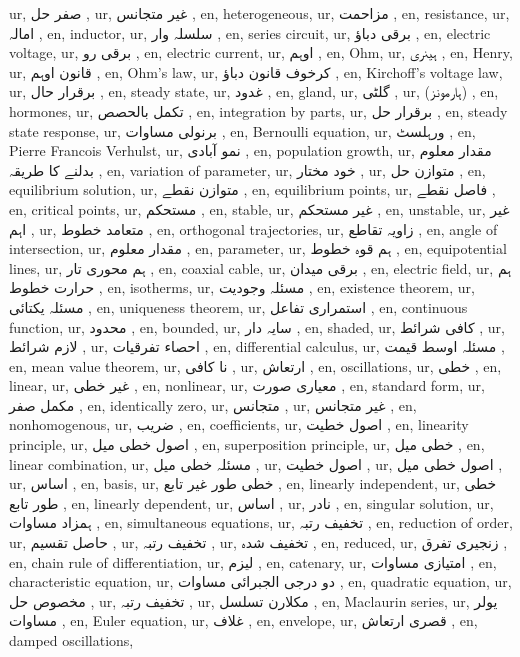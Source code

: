 ur, صفر حل ,
ur, غیر متجانس ,
en, heterogeneous,
ur, مزاحمت ,
en, resistance,
ur, امالہ ,
en, inductor,
ur, سلسلہ وار ,
en, series circuit,
ur, برقی دباؤ ,
en, electric voltage,
ur, برقی رو ,
en, electric current,
ur, اوہم ,
en, Ohm,
ur, ہینری ,
en, Henry,
ur, قانون اوہم ,
en, Ohm's law,
ur, کرخوف قانون دباؤ ,
en, Kirchoff's voltage law,
ur, برقرار حال ,
en, steady state,
ur, غدود ,
en, gland,
ur, گلٹی ,
ur, (ہارمونز) ,
en, hormones,
ur, تکمل بالحصص ,
en, integration by parts,
ur, برقرار حل ,
en, steady state response,
ur, برنولی مساوات ,
en, Bernoulli equation,
ur, ورہلسٹ ,
en, Pierre Francois Verhulst,
ur, نمو آبادی ,
en, population growth,
ur, مقدار معلوم بدلنے کا طریقہ ,
en, variation of parameter,
ur, خود مختار ,
ur, متوازن حل ,
en, equilibrium solution,
ur, متوازن نقطے ,
en, equilibrium points,
ur, فاصل نقطے ,
en, critical points,
ur, مستحکم ,
en, stable,
ur, غیر مستحکم ,
en, unstable,
ur, غیر اہم ,
ur, متعامد خطوط ,
en, orthogonal trajectories,
ur, زاویہ تقاطع ,
en, angle of intersection,
ur, مقدار معلوم ,
en, parameter,
ur, ہم قوہ خطوط ,
en, equipotential lines,
ur, ہم محوری تار ,
en, coaxial cable,
ur, برقی میدان ,
en, electric field,
ur, ہم حرارت خطوط ,
en, isotherms,
ur, مسئلہ وجودیت ,
en, existence theorem,
ur, مسئلہ یکتائی ,
en, uniqueness theorem,
ur, استمراری تفاعل ,
en, continuous function,
ur, محدود ,
en, bounded,
ur, سایہ دار ,
en, shaded,
ur, کافی شرائط ,
ur, لازم شرائط ,
ur, احصاء تفرقیات ,
en, differential calculus,
ur, مسئلہ اوسط قیمت ,
en, mean value theorem,
ur, نا کافی ,
ur, ارتعاش ,
en, oscillations,
ur, خطی ,
en, linear,
ur, غیر خطی ,
en, nonlinear,
ur, معیاری صورت ,
en, standard form,
ur, مکمل صفر ,
en, identically zero,
ur, متجانس ,
ur, غیر متجانس ,
en, nonhomogenous,
ur,  ضریب  ,
en, coefficients,
ur, اصول خطیت ,
en, linearity principle,
ur, اصول خطی میل ,
en, superposition principle,
ur, خطی میل ,
en, linear combination,
ur, مسئلہ خطی میل ,
ur, اصول خطیت ,
ur, اصول خطی میل ,
ur, اساس ,
en, basis,
ur, خطی طور غیر تابع ,
en, linearly independent,
ur, خطی طور تابع ,
en, linearly dependent,
ur, اساس ,
ur, نادر ,
en, singular solution,
ur, ہمزاد مساوات ,
en, simultaneous equations,
ur, تخفیف رتبہ ,
en, reduction of order,
ur, حاصل تقسیم ,
ur, تخفیف رتبہ ,
ur, تخفیف شدہ ,
en, reduced,
ur, زنجیری تفرق ,
en, chain rule of differentiation,
ur, لیزم ,
en, catenary,
ur, امتیازی مساوات ,
en, characteristic equation,
ur, دو درجی الجبرائی مساوات ,
en, quadratic equation,
ur, مخصوص حل ,
ur, تخفیف رتبہ ,
ur, مکلارن تسلسل ,
en, Maclaurin series,
ur, یولر مساوات ,
en, Euler equation,
ur, غلاف ,
en, envelope,
ur, قصری ارتعاش ,
en, damped oscillations,
